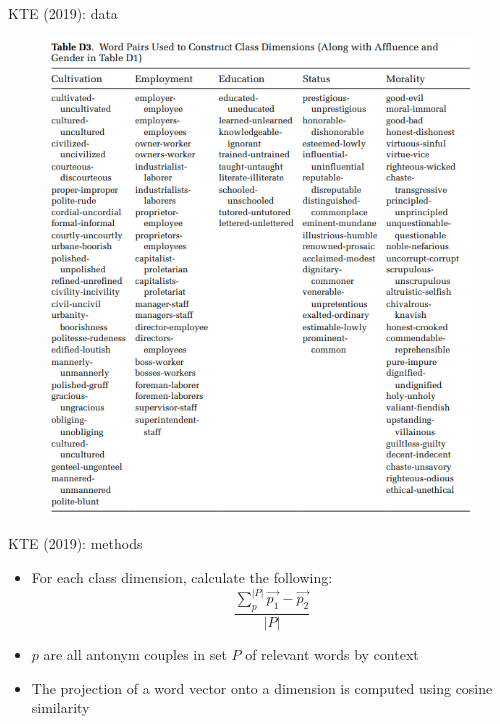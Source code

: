 \documentclass[usenames,dvipsnames,english]{beamer}
\begin{document}
\begin{frame}{KTE (2019): data}
\begin{figure}
    \centering
    \includegraphics[scale = 0.5]{Images/kte_methods2.png}
    \end{figure}
\end{frame}
\begin{frame}{KTE (2019): methods}
    \begin{itemize}
    \setlength{\itemsep}{1.5em}
        \item For each class dimension, calculate the following:
$$
\frac{\sum_{p}^{|P|} \overrightarrow{p_{1}}-\overrightarrow{p_{2}}}{|P|}
$$

        \item $p$ are all antonym couples in set $P$ of relevant words by context 
        \item The projection of a word vector onto a dimension is computed using cosine similarity

    \end{itemize}
\end{frame}
\end{document}
